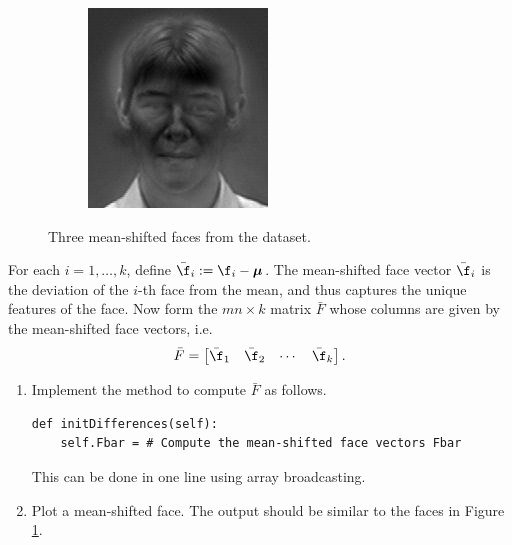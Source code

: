 \begin{figure}
\begin{subfigure}[b]{0.3\textwidth}
\end{subfigure}
\begin{subfigure}[b]{0.3\textwidth}
\includegraphics[width=\textwidth]{differenceFace2.png}
\end{subfigure}
\caption{Three mean-shifted faces from the dataset.}
\label{facialRecognition:differenceFaces}
\end{figure}
For each $i = 1,\ldots, k$, define $\bar{\f}_i := \f_i - {\boldsymbol \mu}$.
The mean-shifted face vector $\bar{\f}_i$ is the deviation of the $i$-th face from the mean, and thus captures the unique features of the face.
Now form the $mn \times k$ matrix $\bar{F}$ whose columns are given by the mean-shifted face vectors, i.e.
\[
\bar{F} = \begin{bmatrix}
\bar{\f}_1 & \bar{\f}_2 & \cdots & \bar{\f}_k
\end{bmatrix}.
\]
\begin{problem}
\leavevmode
\begin{enumerate}
\item Implement the method  to compute $\bar{F}$ as follows.
\begin{lstlisting}
def initDifferences(self):
    self.Fbar = # Compute the mean-shifted face vectors Fbar
\end{lstlisting}
This can be done in one line using array broadcasting.
\item
Plot a mean-shifted face. The output should be similar to the faces in Figure \ref{facialRecognition:differenceFaces}.
\end{enumerate}
\end{problem}

